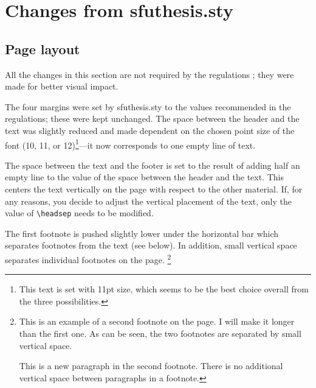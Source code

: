 
%
%

\chapter{Changes from \textsf{sfuthesis.sty}}
\label{two}

\section{Page layout}

All the changes in
this section are not required by the regulations%
; they were made for better visual impact.

The four margins were set by \textsf{sfuthesis.sty}%
 to the values recommended
in the regulations; these were kept
unchanged. The space between the header and the text was
slightly reduced and made dependent on the chosen point size of the
font (10, 11, or 12)\footnote{This text is set with 11pt size, which
  seems to be the best choice overall from the three
  possibilities.}---it now corresponds to one empty line of text.

The space between the text and the footer is set to the result of
adding half an empty line to the value of the space between the header
and the text. This centers the text vertically on the page with
respect to the other material. If, for any reasons, you decide to
adjust the vertical placement of the text, only the value of
\verb+\headsep+ needs to be modified.

The first footnote is pushed slightly lower under the
horizontal bar which separates footnotes from the text (see below). In
addition,
small vertical space separates individual footnotes on the page.\label{foot}%
\footnote{This is an example of a second footnote on the page. I will
  make it longer than the first one. As can be seen, the two footnotes
  are separated by small vertical space.

  This is a new paragraph in the second footnote. There is no
  additional vertical space between
  paragraphs in a footnote.}

